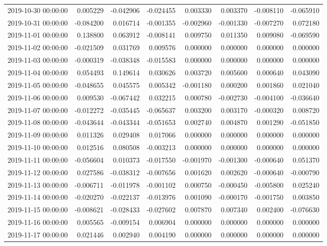 \begin{tabular}{lrrrrrrr}
2019-10-30 00:00:00 & 0.005229 & -0.042906 & -0.024455 & 0.003330 & 0.003370 & -0.008110 & -0.065910 \\
2019-10-31 00:00:00 & -0.084200 & 0.016714 & -0.001355 & -0.002960 & -0.001330 & -0.007270 & 0.072180 \\
2019-11-01 00:00:00 & 0.138800 & 0.063912 & -0.008141 & 0.009750 & 0.011350 & 0.009080 & -0.069590 \\
2019-11-02 00:00:00 & -0.021509 & 0.031769 & 0.009576 & 0.000000 & 0.000000 & 0.000000 & 0.000000 \\
2019-11-03 00:00:00 & -0.000319 & -0.038348 & -0.015583 & 0.000000 & 0.000000 & 0.000000 & 0.000000 \\
2019-11-04 00:00:00 & 0.054493 & 0.149614 & 0.030626 & 0.003720 & 0.005600 & 0.000640 & 0.043090 \\
2019-11-05 00:00:00 & -0.048655 & 0.045575 & 0.005342 & -0.001180 & 0.000200 & 0.001860 & 0.021040 \\
2019-11-06 00:00:00 & 0.009530 & -0.067442 & 0.032215 & 0.000780 & -0.002730 & -0.004100 & -0.036640 \\
2019-11-07 00:00:00 & -0.012272 & -0.035445 & -0.065637 & 0.003200 & 0.003170 & -0.000320 & 0.008720 \\
2019-11-08 00:00:00 & -0.043644 & -0.043344 & -0.051653 & 0.002740 & 0.004870 & 0.001290 & -0.051850 \\
2019-11-09 00:00:00 & 0.011326 & 0.029408 & 0.017066 & 0.000000 & 0.000000 & 0.000000 & 0.000000 \\
2019-11-10 00:00:00 & 0.012516 & 0.080508 & -0.003213 & 0.000000 & 0.000000 & 0.000000 & 0.000000 \\
2019-11-11 00:00:00 & -0.056604 & 0.010373 & -0.017550 & -0.001970 & -0.001300 & -0.000640 & 0.051370 \\
2019-11-12 00:00:00 & 0.027586 & -0.038312 & -0.007656 & 0.001620 & 0.002620 & -0.000640 & -0.000790 \\
2019-11-13 00:00:00 & -0.006711 & -0.011978 & -0.001102 & 0.000750 & -0.000450 & -0.005800 & 0.025240 \\
2019-11-14 00:00:00 & -0.020270 & -0.022137 & -0.013976 & 0.001090 & -0.000170 & -0.001750 & 0.003850 \\
2019-11-15 00:00:00 & -0.008621 & -0.028433 & -0.027602 & 0.007870 & 0.007340 & 0.002400 & -0.076630 \\
2019-11-16 00:00:00 & 0.005565 & -0.009154 & 0.006904 & 0.000000 & 0.000000 & 0.000000 & 0.000000 \\
2019-11-17 00:00:00 & 0.021446 & 0.002940 & 0.004190 & 0.000000 & 0.000000 & 0.000000 & 0.000000 \\

\end{tabular}
